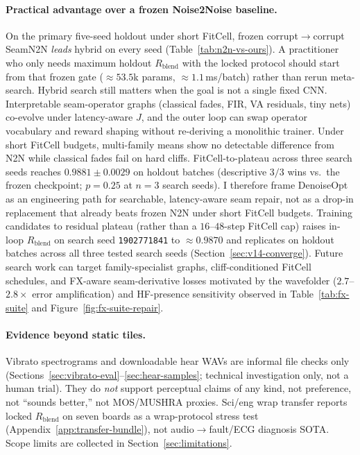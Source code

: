 \paragraph{Practical advantage over a frozen Noise2Noise baseline.}
On the primary five-seed holdout under short FitCell, frozen corrupt$\to$corrupt SeamN2N \emph{leads} hybrid on every seed (Table~\ref{tab:n2n-vs-ours}).
A practitioner who only needs maximum holdout $R_{\mathrm{blend}}$ with the locked protocol should start from that frozen gate (${\approx}53.5$k params, ${\approx}1.1$\,ms/batch) rather than rerun meta-search.
Hybrid search still matters when the goal is not a single fixed CNN. Interpretable seam-operator graphs (classical fades, FIR, VA residuals, tiny nets) co-evolve under latency-aware $J$, and the outer loop can swap operator vocabulary and reward shaping without re-deriving a monolithic trainer. Under short FitCell budgets, multi-family means show no detectable difference from N2N while classical fades fail on hard cliffs. FitCell-to-plateau across three search seeds reaches $0.9881{\pm}0.0029$ on holdout batches (descriptive $3/3$ wins vs.\ the frozen checkpoint; $p{=}0.25$ at $n{=}3$ search seeds).
I therefore frame DenoiseOpt as an engineering path for searchable, latency-aware seam repair, not as a drop-in replacement that already beats frozen N2N under short FitCell budgets.
Training candidates to residual plateau (rather than a $16$--$48$-step FitCell cap) raises in-loop $R_{\mathrm{blend}}$ on search seed \texttt{1902771841} to ${\approx}0.9870$ and replicates on holdout batches across all three tested search seeds (Section~\ref{sec:v14-converge}).
Future search work can target family-specialist graphs, cliff-conditioned FitCell schedules, and FX-aware seam-derivative losses motivated by the wavefolder ($2.7$--$2.8{\times}$ error amplification) and HF-presence sensitivity observed in Table~\ref{tab:fx-suite} and Figure~\ref{fig:fx-suite-repair}.

\paragraph{Evidence beyond static tiles.}
Vibrato spectrograms and downloadable hear WAVs are informal file checks only
(Sections~\ref{sec:vibrato-eval}--\ref{sec:hear-samples}; technical investigation only, not a human trial).
They do \emph{not} support perceptual claims of any kind, not preference, not ``sounds better,'' not MOS/MUSHRA proxies.
Sci/eng wrap transfer reports locked $R_{\mathrm{blend}}$ on seven boards as a wrap-protocol stress test
(Appendix~\ref{app:transfer-bundle}), not audio$\to$fault/ECG diagnosis SOTA.
Scope limits are collected in Section~\ref{sec:limitations}.
